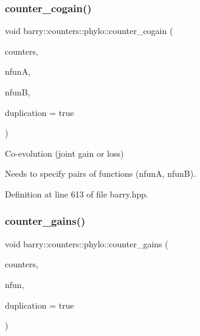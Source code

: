 \subsubsection{\texorpdfstring{counter\+\_\+cogain()}{counter\_cogain()}}
{\footnotesize\ttfamily void barry\+::counters\+::phylo\+::counter\+\_\+cogain (\begin{DoxyParamCaption}\item[{\hyperlink{namespacebarry_1_1counters_1_1phylo_a4e401ffe66d04091343dcffaf915f8c3}{Phylo\+Counters} $\ast$}]{counters,  }\item[{\hyperlink{namespacebarry_a11dfc53ddb4672278319aa04f1e09a6c}{uint}}]{nfunA,  }\item[{\hyperlink{namespacebarry_a11dfc53ddb4672278319aa04f1e09a6c}{uint}}]{nfunB,  }\item[{bool}]{duplication = {\ttfamily true} }\end{DoxyParamCaption})\hspace{0.3cm}{\ttfamily [inline]}}



Co-\/evolution (joint gain or loss) 

Needs to specify pairs of functions ({\ttfamily nfunA}, {\ttfamily nfunB}). 

Definition at line 613 of file barry.\+hpp.

\mbox{\label{namespacebarry_1_1counters_1_1phylo_afc1215e596c2f5a5e3b6f39273427a9a}} 
\subsubsection{\texorpdfstring{counter\+\_\+gains()}{counter\_gains()}}
{\footnotesize\ttfamily void barry\+::counters\+::phylo\+::counter\+\_\+gains (\begin{DoxyParamCaption}\item[{\hyperlink{namespacebarry_1_1counters_1_1phylo_a4e401ffe66d04091343dcffaf915f8c3}{Phylo\+Counters} $\ast$}]{counters,  }\item[{std\+::vector$<$ \hyperlink{namespacebarry_a11dfc53ddb4672278319aa04f1e09a6c}{uint} $>$}]{nfun,  }\item[{bool}]{duplication = {\ttfamily true} }\end{DoxyParamCaption})\hspace{0.3cm}{\ttfamily [inline]}}




